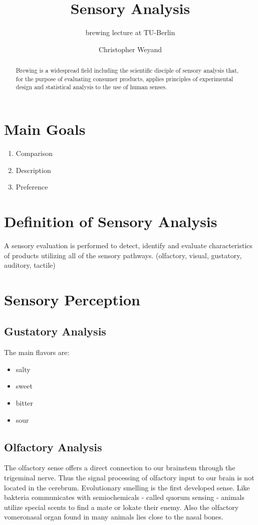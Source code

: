 \documentclass[]{scrartcl}
\begin{document}
\title{Sensory Analysis}
\subtitle{brewing lecture at TU-Berlin}
\author{Christopher Weyand}
\maketitle
\begin{abstract}
Brewing is a widespread field including the scientific disciple of sensory analysis
that, for the purpose of evaluating consumer products, applies principles of experimental
design and statistical analysis to the use of human senses.
\end{abstract}
\newpage

\tableofcontents
\newpage

\listoffigures
\newpage


\section{Main Goals}
\begin{enumerate}
  \item Comparison
  \item Description
  \item Preference
\end{enumerate}


\section{Definition of Sensory Analysis}
A sensory evaluation is performed to detect, identify and evaluate
characteristics of products utilizing all of the sensory pathways.
(olfactory, visual, gustatory, auditory, tactile)


\section{Sensory Perception}
\subsection{Gustatory Analysis}
The main flavors are:
\begin{itemize}
  \item salty
  \item sweet
  \item bitter
  \item sour
\end{itemize}

\subsection{Olfactory Analysis}
The olfactory sense offers a direct connection to our brainstem through the trigeminal nerve.
Thus the signal processing of olfactory input to our brain is not located in the cerebrum.
Evolutionary smelling is the first developed sense. Like bakteria communicates with semiochemicals
- called quorum sensing - animals utilize special scents to find a mate or lokate their enemy. Also the olfactory
vomeronasal organ found in many animals lies close to the nasal bones.
\end{document}
